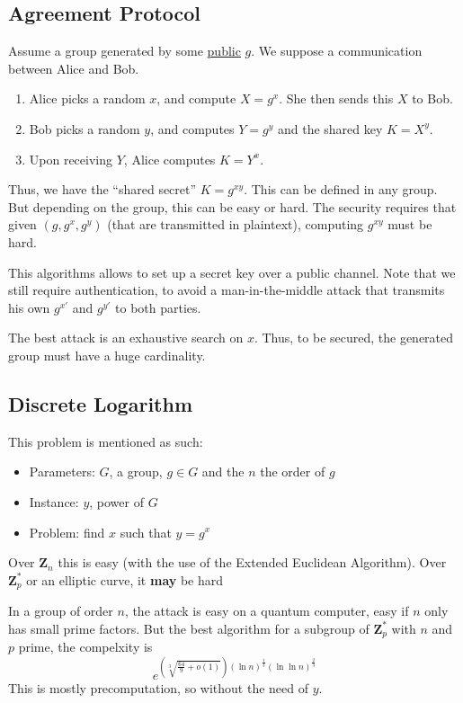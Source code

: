 \documentclass[11pt,a4paper]{article}
\newcommand{\bz}{\ensuremath{\mathbf{Z}}}
\begin{document}
\subsection{Agreement Protocol}
\label{sub:Agreement Protocol}
Assume a group generated by some \uline{public} $g$. We suppose a communication between Alice and Bob.
\begin{enumerate}
    \item Alice picks a random $x$, and compute $X = g^x$. She then sends this $X$ to Bob.
    \item Bob picks a random $y$, and computes $Y = g^y$ and the shared key $K = X^y$.
    \item Upon receiving $Y$, Alice computes $K = Y^x$.
\end{enumerate}
Thus, we have the ``shared secret'' $K = g^{xy}$. This can be defined in any group. But depending on the group, this can be easy or hard. The security requires that given $(g, g^x, g^y)$ (that are transmitted in plaintext), computing $g^{xy}$ must be hard.

This algorithms allows to set up a secret key over a public channel. Note that we still require authentication, to avoid a man-in-the-middle attack that transmits his own $g^{x'}$ and $g^{y'}$ to both parties.

The best attack is an exhaustive search on $x$. Thus, to be secured, the generated group must have a huge cardinality.

\subsection{Discrete Logarithm} %
\label{sub:Discrete Logarithm}
This problem is mentioned as such:
\begin{itemize}
    \item Parameters: $G$, a group, $g \in G$ and the $n$ the order of $g$
    \item Instance: $y$, power of $G$
    \item Problem: find $x$ such that $y = g^x$
\end{itemize}
\begin{example}
    Over $\bz_n$ this is easy (with the use of the Extended Euclidean Algorithm). Over $\bz_p^*$ or an elliptic curve, it \textbf{may} be hard
\end{example}
In a group of order $n$, the attack is easy on a quantum computer, easy if $n$ only has small prime factors. But the best algorithm for a subgroup of $\bz_p^*$ with $n$ and $p$ prime, the compelxity is
\[e^{\left(\sqrt[3]{\frac{64}{9} + o(1)}\right) (\ln n)^{\frac{1}{3}}(\ln\ln n)^{\frac{2}{3}}}\]
This is mostly precomputation, so without the need of $y$.
\end{document}
